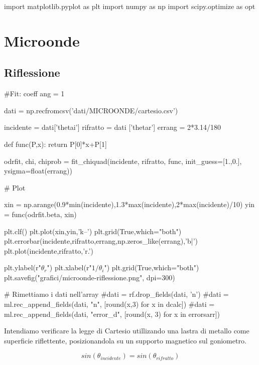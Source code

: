 \begin{sagesilent}
import matplotlib.pyplot as plt
import numpy as np
import scipy.optimize as opt
\end{sagesilent}


\chapter{Microonde}

\section{Riflessione}
\begin{sagesilent}
#Fit: coeff ang = 1

dati = np.recfromcsv('dati/MICROONDE/cartesio.csv')

incidente = dati['thetai']
rifratto = dati ['thetar']
errang = 2*3.14/180

def func(P,x):
    return P[0]*x+P[1]

odrfit, chi, chiprob = fit_chiquad(incidente, rifratto, func, init_guess=[1.,0.], ysigma=float(errang))


# Plot

xin = np.arange(0.9*min(incidente),1.3*max(incidente),2*max(incidente)/10)
yin = func(odrfit.beta, xin)

plt.clf()
plt.plot(xin,yin,'k--')
plt.grid(True,which="both")
plt.errorbar(incidente,rifratto,errang,np.zeros_like(errang),'b|')
plt.plot(incidente,rifratto,'r.')

plt.ylabel(r"$\theta_r$")
plt.xlabel(r"$1/\theta_i$")
plt.grid(True,which="both")
plt.savefig("grafici/microonde-riflessione.png", dpi=300)


# Rimettiamo i dati nell'array
#dati = rf.drop_fields(dati, 'n')
#dati = ml.rec_append_fields(dati, "n", [round(x,3) for x in dcalc])
#dati = ml.rec_append_fields(dati, "error_d", [round(x, 3) for x in errorsarr])


\end{sagesilent}


Intendiamo verificare la legge di Cartesio utillizando una lastra di metallo come superficie riflettente, posizionandola su un supporto magnetico sul goniometro.

\begin{equation}
sin(\theta_{incidente}) = sin(\theta_{rifratto})
\end{equation}

